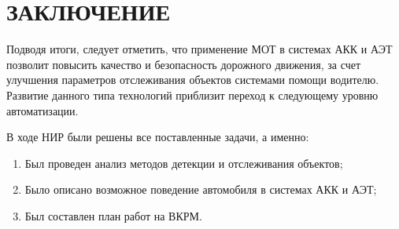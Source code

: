 \chapter*{ЗАКЛЮЧЕНИЕ}

Подводя итоги, следует отметить, что применение МОТ в системах АКК и АЭТ позволит повысить качество и безопасность дорожного движения, за счет улучшения параметров отслеживания объектов системами помощи водителю. Развитие данного типа технологий приблизит переход к следующему уровню автоматизации. 

В ходе НИР были решены все поставленные задачи, а именно:

\begin{enumerate}

	\item Был проведен анализ методов детекции и отслеживания объектов;
	\item Было описано возможное поведение автомобиля в системах АКК и АЭТ;
	\item Был составлен план работ на ВКРМ.
	
\end{enumerate}